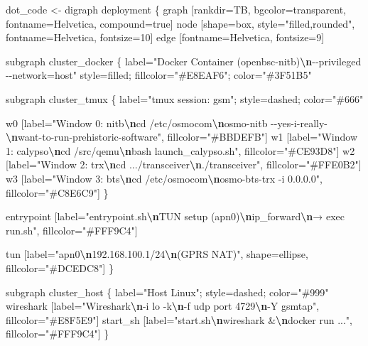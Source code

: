 \documentclass[
]{article}
\newenvironment{Shaded}{\begin{snugshade}}{\end{snugshade}}
\newcommand{\NormalTok}[1]{#1}
\newcommand{\OtherTok}[1]{\textcolor[rgb]{0.56,0.35,0.01}{#1}}
\newcommand{\SpecialCharTok}[1]{\textcolor[rgb]{0.81,0.36,0.00}{\textbf{#1}}}
\newcommand{\StringTok}[1]{\textcolor[rgb]{0.31,0.60,0.02}{#1}}
\begin{document}
\begin{Shaded}
\begin{Highlighting}[]
\NormalTok{dot\_code }\OtherTok{\textless{}{-}} \StringTok{\textquotesingle{}digraph deployment \{}
\StringTok{  graph [rankdir=TB, bgcolor=transparent, fontname=Helvetica, compound=true]}
\StringTok{  node [shape=box, style="filled,rounded", fontname=Helvetica, fontsize=10]}
\StringTok{  edge [fontname=Helvetica, fontsize=9]}

\StringTok{  subgraph cluster\_docker \{}
\StringTok{    label="Docker Container (openbsc{-}nitb)}\SpecialCharTok{\textbackslash{}n}\StringTok{{-}{-}privileged {-}{-}network=host"}
\StringTok{    style=filled; fillcolor="\#E8EAF6"; color="\#3F51B5"}

\StringTok{    subgraph cluster\_tmux \{}
\StringTok{      label="tmux session: gsm"; style=dashed; color="\#666"}

\StringTok{      w0 [label="Window 0: nitb}\SpecialCharTok{\textbackslash{}n}\StringTok{cd /etc/osmocom}\SpecialCharTok{\textbackslash{}n}\StringTok{osmo{-}nitb {-}{-}yes{-}i{-}really{-}}\SpecialCharTok{\textbackslash{}n}\StringTok{want{-}to{-}run{-}prehistoric{-}software",}
\StringTok{          fillcolor="\#BBDEFB"]}
\StringTok{      w1 [label="Window 1: calypso}\SpecialCharTok{\textbackslash{}n}\StringTok{cd /src/qemu}\SpecialCharTok{\textbackslash{}n}\StringTok{bash launch\_calypso.sh",}
\StringTok{          fillcolor="\#CE93D8"]}
\StringTok{      w2 [label="Window 2: trx}\SpecialCharTok{\textbackslash{}n}\StringTok{cd .../transceiver}\SpecialCharTok{\textbackslash{}n}\StringTok{./transceiver",}
\StringTok{          fillcolor="\#FFE0B2"]}
\StringTok{      w3 [label="Window 3: bts}\SpecialCharTok{\textbackslash{}n}\StringTok{cd /etc/osmocom}\SpecialCharTok{\textbackslash{}n}\StringTok{osmo{-}bts{-}trx {-}i 0.0.0.0",}
\StringTok{          fillcolor="\#C8E6C9"]}
\StringTok{    \}}

\StringTok{    entrypoint [label="entrypoint.sh}\SpecialCharTok{\textbackslash{}n}\StringTok{TUN setup (apn0)}\SpecialCharTok{\textbackslash{}n}\StringTok{ip\_forward}\SpecialCharTok{\textbackslash{}n}\StringTok{→ exec run.sh",}
\StringTok{                fillcolor="\#FFF9C4"]}

\StringTok{    tun [label="apn0}\SpecialCharTok{\textbackslash{}n}\StringTok{192.168.100.1/24}\SpecialCharTok{\textbackslash{}n}\StringTok{(GPRS NAT)", shape=ellipse, fillcolor="\#DCEDC8"]}
\StringTok{  \}}

\StringTok{  subgraph cluster\_host \{}
\StringTok{    label="Host Linux"; style=dashed; color="\#999"}
\StringTok{    wireshark [label="Wireshark}\SpecialCharTok{\textbackslash{}n}\StringTok{{-}i lo {-}k}\SpecialCharTok{\textbackslash{}n}\StringTok{{-}f udp port 4729}\SpecialCharTok{\textbackslash{}n}\StringTok{{-}Y gsmtap", fillcolor="\#E8F5E9"]}
\StringTok{    start\_sh [label="start.sh}\SpecialCharTok{\textbackslash{}n}\StringTok{wireshark \&}\SpecialCharTok{\textbackslash{}n}\StringTok{docker run ...", fillcolor="\#FFF9C4"]}
\StringTok{  \}}


\end{Highlighting}
\end{Shaded}
\end{document}
